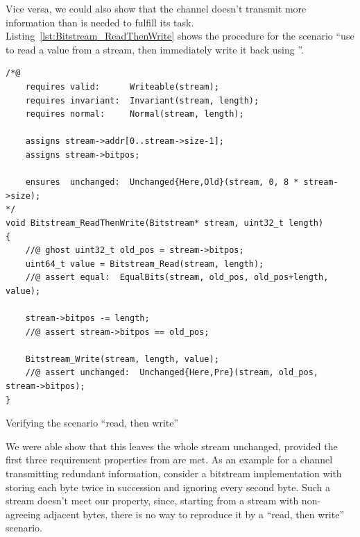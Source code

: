 Vice versa, we could also show that the channel doesn't transmit more
information than is needed to fulfill its task.
%
Listing~\ref{lst:Bitstream_ReadThenWrite}
shows the procedure for the scenario ``use 
to read a value from a stream, then immediately write it back using
''.




\begin{listing}[hbt]
\begin{minipage}{0.99\textwidth}
\begin{lstlisting}[style=acsl-block]
/*@
    requires valid:      Writeable(stream);
    requires invariant:  Invariant(stream, length);
    requires normal:     Normal(stream, length);

    assigns stream->addr[0..stream->size-1];
    assigns stream->bitpos;

    ensures  unchanged:  Unchanged{Here,Old}(stream, 0, 8 * stream->size);
*/
void Bitstream_ReadThenWrite(Bitstream* stream, uint32_t length)
{
    //@ ghost uint32_t old_pos = stream->bitpos;
    uint64_t value = Bitstream_Read(stream, length);
    //@ assert equal:  EqualBits(stream, old_pos, old_pos+length, value);

    stream->bitpos -= length;
    //@ assert stream->bitpos == old_pos;

    Bitstream_Write(stream, length, value);
    //@ assert unchanged:  Unchanged{Here,Pre}(stream, old_pos, stream->bitpos);
}
\end{lstlisting}
\end{minipage}
\caption{\label{lst:Bitstream_ReadThenWrite}
	Verifying the scenario ``read, then write'' }
\end{listing}


\FloatBarrier


We were able show that this leaves the
whole stream unchanged, provided the first three requirement properties
from  are met.
%
As an example for a channel transmitting redundant information,
consider
a bitstream implementation
with 
storing each byte twice in succession and 
ignoring every second byte.
%
Such a stream doesn't meet our property, since, 
starting from a stream with non-agreeing adjacent bytes, there is no
way to reproduce it by a ``read, then write'' scenario.
